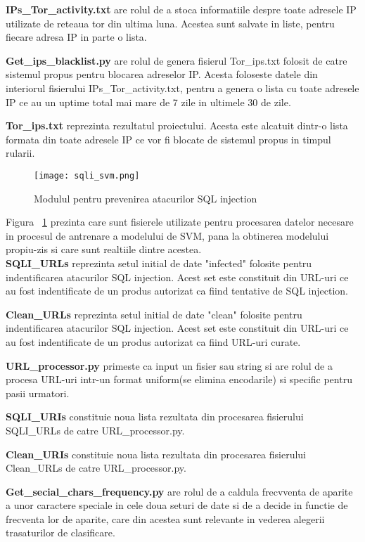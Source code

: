 \textbf{IPs\_Tor\_activity.txt} are rolul de a stoca informatiile despre toate adresele IP utilizate de reteaua tor din ultima luna. Acestea sunt salvate in liste, pentru fiecare adresa IP in parte o lista. 

\textbf{Get\_ips\_blacklist.py} are rolul de genera fisierul Tor\_ips.txt folosit de catre sistemul propus pentru blocarea adreselor IP. Acesta foloseste datele din interiorul fisierului IPs\_Tor\_activity.txt, pentru a genera o lista cu toate adresele IP ce au un uptime total mai mare de 7 zile in ultimele 30 de zile.

\textbf{Tor\_ips.txt} reprezinta rezultatul proiectului. Acesta este alcatuit dintr-o lista formata din toate adresele IP ce vor fi blocate de sistemul propus in timpul rularii.

\newpage

\begin{figure}[h]
	\centering
	\texttt{[image: sqli\_svm.png]}
	\caption{Modulul pentru prevenirea atacurilor SQL injection}
	\label{fig:sqli_svm}
\end{figure}
Figura ~\ref{fig:sqli_svm} prezinta care sunt fisierele utilizate pentru procesarea datelor necesare in procesul de antrenare a modelului de SVM, pana la obtinerea modelului propiu-zis si care sunt realtiile dintre acestea. \\

\textbf{SQLI\_URLs} reprezinta setul initial de date "infected" folosite pentru indentificarea atacurilor SQL injection. Acest set este constituit din URL-uri ce au fost indentificate de un produs autorizat ca fiind tentative de SQL injection.

\textbf{Clean\_URLs} reprezinta setul initial de date "clean" folosite pentru indentificarea atacurilor SQL injection. Acest set este constituit din URL-uri ce au fost indentificate de un produs autorizat ca fiind URL-uri curate.

\textbf{URL\_processor.py} primeste ca input un fisier sau string si are rolul de a procesa URL-uri intr-un format uniform(se elimina encodarile) si specific pentru pasii urmatori.

\textbf{SQLI\_URIs} constituie noua lista rezultata din procesarea fisierului SQLI\_URLs de catre URL\_processor.py.

\textbf{Clean\_URIs} constituie noua lista rezultata din procesarea fisierului Clean\_URLs de catre URL\_processor.py.

\textbf{Get\_secial\_chars\_frequency.py} are rolul de a caldula frecvventa de aparite a unor caractere speciale in cele doua seturi de date si de a decide in functie de frecventa lor de aparite, care din acestea sunt relevante in vederea alegerii trasaturilor de clasificare.

